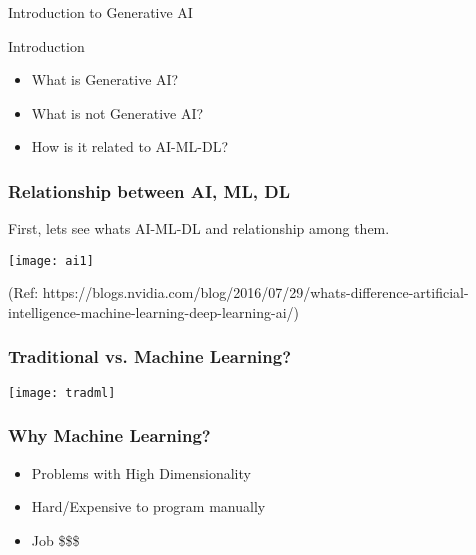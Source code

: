 \begin{frame}[fragile]\frametitle{}
\begin{center}
{\Large Introduction to Generative AI}
\end{center}
\end{frame}

\begin{frame}[fragile]{Introduction}
\begin{itemize}
\item What is Generative AI?
\item What is not Generative AI?
\item How is it related to AI-ML-DL?
\end{itemize}
\end{frame}

\begin{frame}[fragile]\frametitle{Relationship between AI, ML, DL}

First, lets see whats AI-ML-DL and relationship among them.

\begin{center}
\texttt{[image: ai1]}
\end{center}

{\tiny (Ref: https://blogs.nvidia.com/blog/2016/07/29/whats-difference-artificial-intelligence-machine-learning-deep-learning-ai/)}

\end{frame}


\begin{frame}[fragile]\frametitle{Traditional vs. Machine Learning?}
\begin{center}
\texttt{[image: tradml]}
\end{center}
\end{frame}

\begin{frame}[fragile]\frametitle{Why Machine Learning?}
\begin{itemize}
\item Problems with High Dimensionality
\item Hard/Expensive to program manually
\item Job \$\$\$
\end{itemize}
\end{frame}


